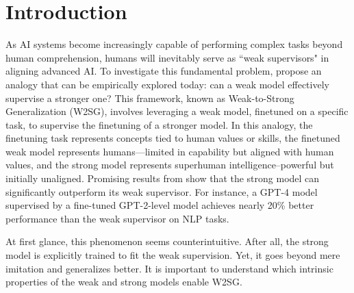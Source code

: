 \section{Introduction}

As AI systems become increasingly capable of performing complex tasks beyond human comprehension, humans will inevitably serve as ``weak supervisors" in aligning advanced AI. To investigate this fundamental problem, \citet{burns2023weak} propose an analogy that can be empirically explored today: can a weak model effectively supervise a stronger one? This framework, known as Weak-to-Strong Generalization (W2SG), involves leveraging a weak model, finetuned on a specific task, to supervise the finetuning of a stronger model. 
In this analogy, the finetuning task represents concepts tied to human values or skills, the finetuned weak model represents humans—limited in capability but aligned with human values, and the strong model represents superhuman intelligence--powerful but initially unaligned. Promising results from \cite{burns2023weak} show that the strong model can significantly outperform its weak supervisor. For instance, a GPT-4 model supervised by a fine-tuned GPT-2-level model achieves nearly 20\% better performance than the weak supervisor on NLP tasks.


At first glance, this phenomenon seems counterintuitive. After all, the strong model is explicitly trained to fit the weak supervision. Yet, it goes beyond mere imitation and generalizes better. It is important to understand which intrinsic properties of the weak and strong models enable W2SG. 

